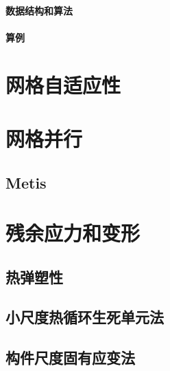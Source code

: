 \subsubsection{数据结构和算法}

\subsubsection{算例}

\chapter{网格自适应性}

\chapter{网格并行}

\section{Metis}

\chapter{残余应力和变形}

\section{热弹塑性}

\section{小尺度热循环生死单元法}

\section{构件尺度固有应变法}
